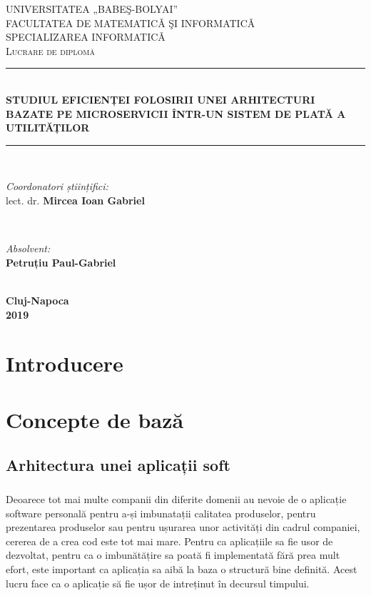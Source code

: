 \documentclass[12pt]{report}
\begin{document}
\begin{titlepage}
 
\newcommand{\HRule}{\rule{\linewidth}{0.5mm}} 
\center
\textsc{UNIVERSITATEA „BABEŞ-BOLYAI” \\
FACULTATEA DE MATEMATICǍ ŞI INFORMATICǍ \\
SPECIALIZAREA INFORMATICǍ}\\[5cm]
\textsc{\large Lucrare de diplomă}\\[0.5cm]

\HRule \\[0.4cm]
{\LARGE  \bfseries STUDIUL EFICIENȚEI FOLOSIRII UNEI ARHITECTURI BAZATE PE MICROSERVICII ÎNTR-UN SISTEM DE PLATĂ A UTILITĂȚILOR}\\[0.4cm]
\HRule \\[1.5cm]
 
\begin{minipage}{0.4\textwidth}
\begin{flushleft} \large
\emph{Coordonatori științifici:}\\
lect. dr. \textbf{Mircea Ioan Gabriel }
\end{flushleft}
\end{minipage}
~
\begin{minipage}{0.4\textwidth}
\begin{flushright} \large
\emph{Absolvent:} \\
\textbf{Petruțiu Paul-Gabriel} 
\end{flushright}
\end{minipage}\\[6cm]
 
{\large \textbf{Cluj-Napoca}}\\[2mm]
{\large \textbf{2019}}
\vfill
\end{titlepage}

\tableofcontents
\cleardoublepage
\listoffigures

\chapter{Introducere} 

\chapter{Concepte de bază} 
  \section{Arhitectura unei aplicații soft}
  	\paragraph{}
  	Deoarece tot mai multe companii din diferite domenii au nevoie de o aplicație software personală pentru a-și imbunatații calitatea produselor, pentru prezentarea produselor sau pentru ușurarea unor activități din cadrul companiei, cererea de a crea cod este tot mai mare. Pentru ca aplicațiile sa fie usor de dezvoltat, pentru ca o imbunătățire sa poată fi implementată fără prea mult efort, este important ca aplicația sa aibă la baza o structură bine definită. Acest lucru face ca o aplicație să fie ușor de intreținut în decursul timpului.
\end{document}
